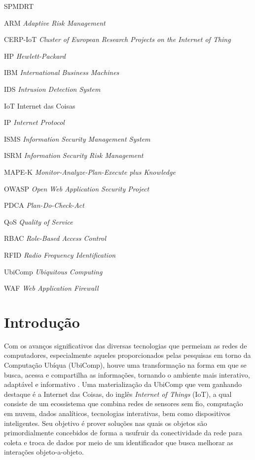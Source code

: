 \documentclass[tid,table]{texufpel} %
\begin{document}
\listoffigures

\listoftables

\begin{listofabbrv}{SPMDRT}
	\item[ARM] \textit{Adaptive Risk Management}
        \item[CERP-IoT] \textit{Cluster of European Research Projects on the Internet of Thing}
	\item[HP] \textit{Hewlett-Packard}
        \item[IBM] \textit{International Business Machines}
        \item[IDS] \textit{Intrusion Detection System}
	\item[IoT] Internet das Coisas
        \item[IP] \textit{Internet Protocol}
        \item[ISMS] \textit{Information Security Management System}
        \item[ISRM] \textit{Information Security Risk Management}
        \item[MAPE-K] \textit{Monitor-Analyze-Plan-Execute plus Knowledge}
        \item[OWASP] \textit{Open Web Application Security Project}
        \item[PDCA] \textit{Plan-Do-Check-Act}
        \item[QoS] \textit{Quality of Service}
        \item[RBAC] \textit{Role-Based Access Control}
        \item[RFID] \textit{Radio Frequency Identification}
	\item[UbiComp] \textit{Ubiquitous Computing}
        \item[WAF] \textit{Web Application Firewall} 
\end{listofabbrv}

\tableofcontents

\chapter{Introdução}

Com os avanços significativos das diversas tecnologias que permeiam as redes de computadores, especialmente aqueles proporcionados pelas pesquisas em torno da Computação Ubíqua (UbiComp), houve uma transformação na forma em que se busca, acessa e compartilha as informações, tornando o ambiente mais interativo, adaptável e informativo \cite{tweneboah17}. Uma materialização da UbiComp que vem ganhando destaque é a Internet das Coisas, do inglês \textit{Internet of Things} (IoT), a qual consiste de um ecossistema que combina redes de sensores sem fio, computação em nuvem, dados analíticos, tecnologias interativas, bem como dispositivos inteligentes. Seu objetivo é prover soluções nas quais os objetos são primordialmente concebidos de forma a usufruir da conectividade da rede para coleta e troca de dados por meio de um identificador que busca melhorar as interações objeto-a-objeto. 
\end{document}
